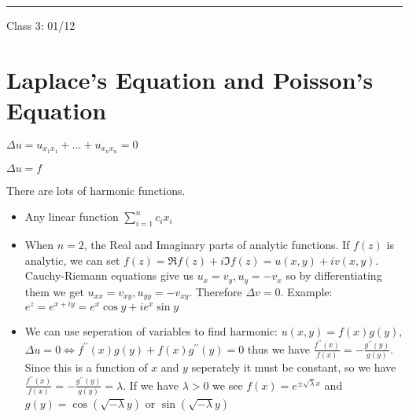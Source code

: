 \documentclass{article}
\theoremstyle{definition}
\begin{document}
\hrule
\hfil

Class 3: 01/12

\section*{Laplace's Equation and Poisson's Equation}

\(\Delta u = u_{x_1 x_1}+\dots +u_{x_n x_n} = 0\)

\(\Delta u = f\) 

There are lots of harmonic functions.

\begin{itemize}
    \item Any linear function \(\sum_{i=1}^{n} c_{i} x_{i} \) 
    \item When \(n=2\), the Real and Imaginary parts of analytic functions. If \(f(z)\) is analytic, we can set \(f(z) = \Re f(z) + i \Im f(z) = u(x,y) + i v(x,y)\). Cauchy-Riemann equations give us \(u_{x} = v_{y} ,u_{y} =-v_{x} \) so by differentiating them we get \(u_{xx} = v_{xy}, u_{yy} = - v_{xy}\). Therefore \(\Delta v = 0\). Example: \(e^z=e^{x+iy} = e^x \cos y + i e^x \sin y \)
    \item We can use seperation of variables to find harmonic: \(u(x,y) = f(x) g(y)\), \(\Delta u = 0 \iff f^{\prime\prime} (x) g(y) + f(x) g^{\prime\prime} (y) =0 \) thus we have \(  \frac{f^{\prime\prime}(x)}{f(x)} = - \frac{g^{\prime\prime}(y)}{g(y)} \). Since this is a function of \(x\) and \(y\) seperately it must be constant, so we have \(  \frac{f^{\prime\prime}(x)}{f(x)} = - \frac{g^{\prime\prime}(y)}{g(y)} = \lambda\). If we have \(\lambda >0\) we see \(f(x) = e^{\pm \sqrt{\lambda } x}\) and \(g(y) = \cos(\sqrt{-\lambda} y)\) or \(\sin (\sqrt{-\lambda } y)\)

\end{itemize}
\end{document}
